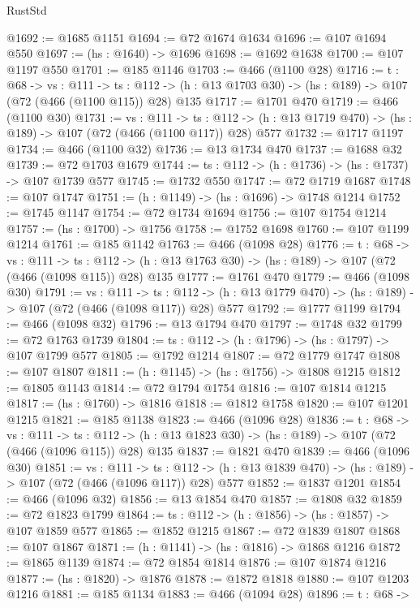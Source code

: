 \begin{lexlean}{RustStd}
\begin{coremodule}
@1692 := @1685 @1151
@1694 := @72 @1674 @1634
@1696 := @107 @1694 @550
@1697 := (hs : @1640) -> @1696
@1698 := @1692 @1638
@1700 := @107 @1197 @550
@1701 := @185 @1146
@1703 := @466 (@1100 @28)
@1716 := {t : @68} ->
  {vs : @111} ->
  {ts : @112} -> (h : @13 @1703 @30) -> (hs : @189) -> @107 (@72 (@466 (@1100 @115)) @28) @135
@1717 := @1701 @470
@1719 := @466 (@1100 @30)
@1731 := {vs : @111} ->
  {ts : @112} -> (h : @13 @1719 @470) -> (hs : @189) -> @107 (@72 (@466 (@1100 @117)) @28) @577
@1732 := @1717 @1197
@1734 := @466 (@1100 @32)
@1736 := @13 @1734 @470
@1737 := @1688 @32
@1739 := @72 @1703 @1679
@1744 := {ts : @112} -> (h : @1736) -> (hs : @1737) -> @107 @1739 @577
@1745 := @1732 @550
@1747 := @72 @1719 @1687
@1748 := @107 @1747
@1751 := (h : @1149) -> (hs : @1696) -> @1748 @1214
@1752 := @1745 @1147
@1754 := @72 @1734 @1694
@1756 := @107 @1754 @1214
@1757 := (hs : @1700) -> @1756
@1758 := @1752 @1698
@1760 := @107 @1199 @1214
@1761 := @185 @1142
@1763 := @466 (@1098 @28)
@1776 := {t : @68} ->
  {vs : @111} ->
  {ts : @112} -> (h : @13 @1763 @30) -> (hs : @189) -> @107 (@72 (@466 (@1098 @115)) @28) @135
@1777 := @1761 @470
@1779 := @466 (@1098 @30)
@1791 := {vs : @111} ->
  {ts : @112} -> (h : @13 @1779 @470) -> (hs : @189) -> @107 (@72 (@466 (@1098 @117)) @28) @577
@1792 := @1777 @1199
@1794 := @466 (@1098 @32)
@1796 := @13 @1794 @470
@1797 := @1748 @32
@1799 := @72 @1763 @1739
@1804 := {ts : @112} -> (h : @1796) -> (hs : @1797) -> @107 @1799 @577
@1805 := @1792 @1214
@1807 := @72 @1779 @1747
@1808 := @107 @1807
@1811 := (h : @1145) -> (hs : @1756) -> @1808 @1215
@1812 := @1805 @1143
@1814 := @72 @1794 @1754
@1816 := @107 @1814 @1215
@1817 := (hs : @1760) -> @1816
@1818 := @1812 @1758
@1820 := @107 @1201 @1215
@1821 := @185 @1138
@1823 := @466 (@1096 @28)
@1836 := {t : @68} ->
  {vs : @111} ->
  {ts : @112} -> (h : @13 @1823 @30) -> (hs : @189) -> @107 (@72 (@466 (@1096 @115)) @28) @135
@1837 := @1821 @470
@1839 := @466 (@1096 @30)
@1851 := {vs : @111} ->
  {ts : @112} -> (h : @13 @1839 @470) -> (hs : @189) -> @107 (@72 (@466 (@1096 @117)) @28) @577
@1852 := @1837 @1201
@1854 := @466 (@1096 @32)
@1856 := @13 @1854 @470
@1857 := @1808 @32
@1859 := @72 @1823 @1799
@1864 := {ts : @112} -> (h : @1856) -> (hs : @1857) -> @107 @1859 @577
@1865 := @1852 @1215
@1867 := @72 @1839 @1807
@1868 := @107 @1867
@1871 := (h : @1141) -> (hs : @1816) -> @1868 @1216
@1872 := @1865 @1139
@1874 := @72 @1854 @1814
@1876 := @107 @1874 @1216
@1877 := (hs : @1820) -> @1876
@1878 := @1872 @1818
@1880 := @107 @1203 @1216
@1881 := @185 @1134
@1883 := @466 (@1094 @28)
@1896 := {t : @68} ->

\end{coremodule}
\end{lexlean}

